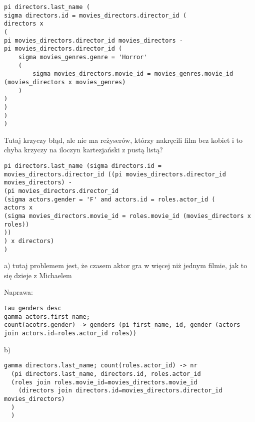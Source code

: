 \documentclass{article}
\begin{document}
\begin{solution}
\begin{lstlisting}
pi directors.last_name (
sigma directors.id = movies_directors.director_id (
directors x 
(
pi movies_directors.director_id movies_directors - 
pi movies_directors.director_id (
	sigma movies_genres.genre = 'Horror' 
	(
		sigma movies_directors.movie_id = movies_genres.movie_id (movies_directors x movies_genres)
	)
)
)
) 
)
\end{lstlisting}

Tutaj krzyczy błąd, ale nie ma reżyserów, którzy nakręcili film bez kobiet i to chyba krzyczy na iloczyn kartezjański z pustą listą?

\begin{lstlisting}
pi directors.last_name (sigma directors.id = movies_directors.director_id ((pi movies_directors.director_id movies_directors) - 
(pi movies_directors.director_id 
(sigma actors.gender = 'F' and actors.id = roles.actor_id (
actors x 
(sigma movies_directors.movie_id = roles.movie_id (movies_directors x roles))
))
) x directors)
)
\end{lstlisting}

\end{solution}

\begin{problem}
\end{problem}

\begin{solution}
  a) tutaj problemem jest, że czasem aktor gra w więcej niż jednym filmie, jak to się dzieje z Michaelem

  Naprawa:
  
  \begin{lstlisting}
tau genders desc
gamma actors.first_name;
count(acotrs.gender) -> genders (pi first_name, id, gender (actors join actors.id=roles.actor_id roles))
  \end{lstlisting}

  b)

\begin{lstlisting}
gamma directors.last_name; count(roles.actor_id) -> nr 
  (pi directors.last_name, directors.id, roles.actor_id 
  (roles join roles.movie_id=movies_directors.movie_id 
    (directors join directors.id=movies_directors.director_id movies_directors)
  )
  )
\end{lstlisting}
\end{solution}
\end{document}
